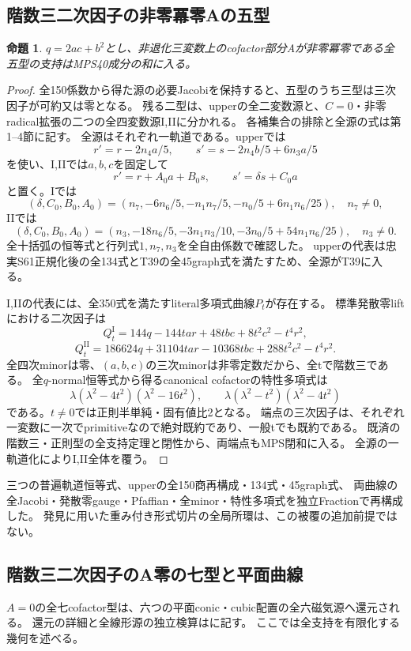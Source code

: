 \documentclass[a4paper,11pt]{ltjsarticle}
\newtheorem{proposition}{命題}[section]
\theoremstyle{definition}
\begin{document}
\subsection{階数三二次因子の非零冪零Aの五型}
\begin{proposition}\label{prop:q3-anil3}
$q=2ac+b^2$とし、非退化三変数上のcofactor部分Aが非零冪零である全五型の支持はMPS40成分の和に入る。
\end{proposition}
\begin{proof}
全150係数から得た源の必要Jacobiを保持すると、五型のうち三型は三次因子が可約又は零となる。
残る二型は、upperの全二変数源と、$C=0$・非零radical拡張の二つの全四変数源I,IIに分かれる。
各補集合の排除と全源の式は第1--4節に記す。
全源はそれぞれ一軌道である。upperでは
\[
 r'=r-2n_4a/5,\qquad s'=s-2n_4b/5+6n_3a/5
\]
を使い、I,IIでは$a,b,c$を固定して
\[
 r'=r+A_0a+B_0s,\qquad s'=\delta s+C_0a
\]
と置く。Iでは
\[
 (\delta,C_0,B_0,A_0)=(n_7,-6n_6/5,-n_1n_7/5,-n_0/5+6n_1n_6/25),\quad n_7\ne0,
\]
IIでは
\[
 (\delta,C_0,B_0,A_0)=(n_3,-18n_6/5,-3n_1n_3/10,-3n_0/5+54n_1n_6/25),\quad n_3\ne0.
\]
全十括弧の恒等式と行列式$1,n_7,n_3$を全自由係数で確認した。
upperの代表は忠実S61正規化後の全134式とT39の全45graph式を満たすため、全源がT39に入る。

I,IIの代表には、全350式を満たすliteral多項式曲線$P_t$が存在する。
標準発散零liftにおける二次因子は
\[
 Q_t^{\mathrm{I}}=144q-144tar+48tbc+8t^2c^2-t^4r^2,
\]
\[
 Q_t^{\mathrm{II}}=186624q+31104tar-10368tbc+288t^2c^2-t^4r^2.
\]
全四次minorは零、$(a,b,c)$の三次minorは非零定数だから、全tで階数三である。
全$q$-normal恒等式から得るcanonical cofactorの特性多項式は
\[
 \lambda(\lambda^2-4t^2)(\lambda^2-16t^2),\qquad
 \lambda(\lambda^2-t^2)(\lambda^2-4t^2)
\]
である。$t\ne0$では正則半単純・固有値比2となる。
端点の三次因子は、それぞれ一変数に一次でprimitiveなので絶対既約であり、一般tでも既約である。
既済の階数三・正則型の全支持定理と閉性から、両端点もMPS閉和に入る。
全源の一軌道化によりI,II全体を覆う。
\end{proof}
三つの普遍軌道恒等式、upperの全150商再構成・134式・45graph式、
両曲線の全Jacobi・発散零gauge・Pfaffian・全minor・特性多項式を独立Fractionで再構成した。
発見に用いた重み付き形式切片の全局所環は、この被覆の追加前提ではない。

\subsection{階数三二次因子のA零の七型と平面曲線}
$A=0$の全七cofactor型は、六つの平面conic・cubic配置の全六磁気源へ還元される。
還元の詳細と全線形源の独立検算はに記す。
ここでは全支持を有限化する幾何を述べる。
\end{document}
